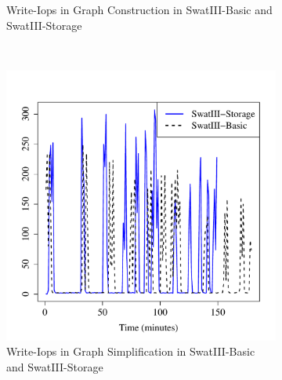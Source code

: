 \documentclass[conference]{IEEEtran}
\begin{document}
\begin{figure}[htb]
\begin{subfigure}[b]{0.3\textwidth}
                \caption{Write-Iops in Graph Construction in SwatIII-Basic and SwatIII-Storage}
                \label{fig:BGHddSsdWrIops}
        \end{subfigure}
        ~ %
        \begin{subfigure}[b]{0.3\textwidth}
                \includegraphics[width=\textwidth]{Figure/SystemData/Plots/ECHddSsdWrIops.pdf}
                \caption{Write-Iops in Graph Simplification in SwatIII-Basic and SwatIII-Storage}
                \label{fig:ECHddSsdWrIops}
        \end{subfigure}
        ~ %
        \begin{subfigure}[b]{0.3\textwidth}

\end{subfigure}
\end{figure}
\end{document}
